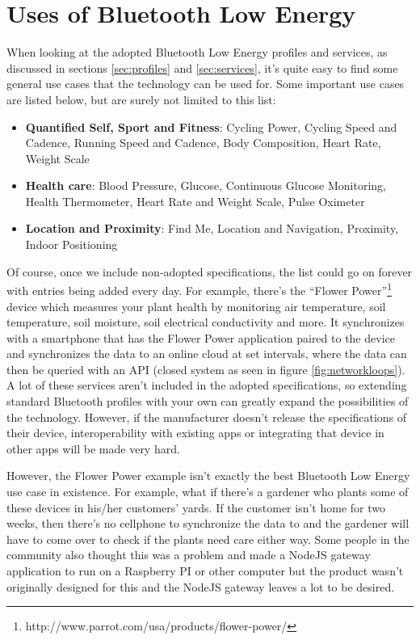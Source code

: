 \documentclass[pdftex,a4paper,12pt,twoside]{report}
\begin{document}
\newpage{}

\section{Uses of Bluetooth Low Energy}
\label{sec:usesble}
When looking at the adopted Bluetooth Low Energy profiles and services, as discussed in sections \ref{sec:profiles} and \ref{sec:services}, it's quite easy to find some general use cases that the technology can be used for. Some important use cases are listed below, but are surely not limited to this list:

\begin{itemize}
	\item{\textbf{Quantified Self, Sport and Fitness}: Cycling Power, Cycling Speed and Cadence, Running Speed and Cadence, Body Composition, Heart Rate, Weight Scale}
	\item{\textbf{Health care}: Blood Pressure, Glucose, Continuous Glucose Monitoring, Health Thermometer, Heart Rate and Weight Scale, Pulse Oximeter}
	\item{\textbf{Location and Proximity}: Find Me, Location and Navigation, Proximity, Indoor Positioning}
\end{itemize}

Of course, once we include non-adopted specifications, the list could go on forever with entries being added every day. For example, there's the ``Flower Power''\footnote{http://www.parrot.com/usa/products/flower-power/} device which measures your plant health by monitoring air temperature, soil temperature, soil moisture, soil electrical conductivity and more. It synchronizes with a smartphone that has the Flower Power application paired to the device and synchronizes the data to an online cloud at set intervals, where the data can then be queried with an API  (closed system as seen in figure \ref{fig:networkloops}). A lot of these services aren't included in the adopted specifications, so extending standard Bluetooth profiles with your own can greatly expand the possibilities of the technology. However, if the manufacturer doesn't release the specifications of their device, interoperability with existing apps or integrating that device in other apps will be made very hard.

However, the Flower Power example isn't exactly the best Bluetooth Low Energy use case in existence. For example, what if there's a gardener who plants some of these devices in his/her customers' yards. If the customer isn't home for two weeks, then there's no cellphone to synchronize the data to and the gardener will have to come over to check if the plants need care either way. Some people in the community also thought this was a problem and made a NodeJS gateway application to run on a Raspberry PI or other computer but the product wasn't originally designed for this and the NodeJS gateway leaves a lot to be desired.
\end{document}

